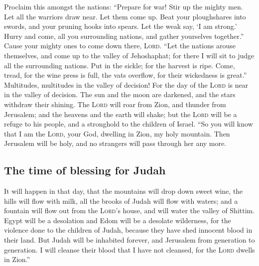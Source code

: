  Proclaim this amongst the nations: ``Prepare for war!
Stir up the mighty men. Let all the warriors draw near. Let them come
up.  Beat your ploughshares into swords, and your pruning
hooks into spears. Let the weak say, `I am strong.' 
Hurry and come, all you surrounding nations, and gather yourselves
together.'' Cause your mighty ones to come down there, \textsc{Lord}.
 ``Let the nations arouse themselves, and come up to the
valley of Jehoshaphat; for there I will sit to judge all the surrounding
nations.  Put in the sickle; for the harvest is ripe.
Come, tread, for the wine press is full, the vats overflow, for their
wickedness is great.''  Multitudes, multitudes in the
valley of decision! For the day of the \textsc{Lord} is near in the
valley of decision.  The sun and the moon are darkened,
and the stars withdraw their shining.  The \textsc{Lord}
will roar from Zion, and thunder from Jerusalem; and the heavens and the
earth will shake; but the \textsc{Lord} will be a refuge to his people,
and a stronghold to the children of Israel.  ``So you
will know that I am the \textsc{Lord}, your God, dwelling in Zion, my
holy mountain. Then Jerusalem will be holy, and no strangers will pass
through her any more.

\hypertarget{the-time-of-blessing-for-judah}{%
\subsection{The time of blessing for
Judah}\label{the-time-of-blessing-for-judah}}

 It will happen in that day, that the mountains will drop
down sweet wine, the hills will flow with milk, all the brooks of Judah
will flow with waters; and a fountain will flow out from the
\textsc{Lord}'s house, and will water the valley of Shittim.
 Egypt will be a desolation and Edom will be a desolate
wilderness, for the violence done to the children of Judah, because they
have shed innocent blood in their land.  But Judah will
be inhabited forever, and Jerusalem from generation to generation.
 I will cleanse their blood that I have not cleansed, for
the \textsc{Lord} dwells in Zion.''
